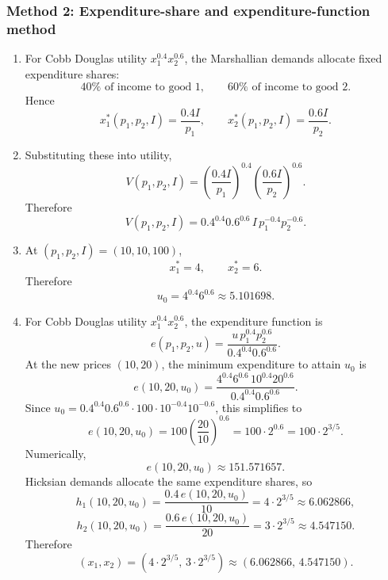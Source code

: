 \documentclass[12pt]{article}
\begin{document}
\subsubsection{Method 2: Expenditure-share and expenditure-function method}
\begin{enumerate}[label=(\alph*)]
    \item
    For Cobb Douglas utility \(x_1^{0.4}x_2^{0.6}\), the Marshallian demands allocate fixed expenditure shares:
    \[
    40\%\text{ of income to good }1,
    \qquad
    60\%\text{ of income to good }2.
    \]
    Hence
    \[
    \boxed{
    x_1^*(p_1,p_2,I)=\frac{0.4I}{p_1},
    \qquad
    x_2^*(p_1,p_2,I)=\frac{0.6I}{p_2}.
    }
    \]

    \item
    Substituting these into utility,
    \[
    V(p_1,p_2,I)
    =
    \left(\frac{0.4I}{p_1}\right)^{0.4}
    \left(\frac{0.6I}{p_2}\right)^{0.6}.
    \]
    Therefore
    \[
    \boxed{
    V(p_1,p_2,I)=0.4^{0.4}0.6^{0.6}\,I\,p_1^{-0.4}p_2^{-0.6}.
    }
    \]

    \item
    At \((p_1,p_2,I)=(10,10,100)\),
    \[
    x_1^*=4,\qquad x_2^*=6.
    \]
    Therefore
    \[
    \boxed{u_0=4^{0.4}6^{0.6}\approx 5.101698.}
    \]

    \item
    For Cobb Douglas utility \(x_1^{0.4}x_2^{0.6}\), the expenditure function is
    \[
    e(p_1,p_2,u)
    =
    \frac{u\,p_1^{0.4}p_2^{0.6}}{0.4^{0.4}0.6^{0.6}}.
    \]
    At the new prices \((10,20)\), the minimum expenditure to attain \(u_0\) is
    \[
    e(10,20,u_0)
    =
    \frac{4^{0.4}6^{0.6}\,10^{0.4}20^{0.6}}{0.4^{0.4}0.6^{0.6}}.
    \]
    Since \(u_0=0.4^{0.4}0.6^{0.6}\cdot 100\cdot 10^{-0.4}10^{-0.6}\), this simplifies to
    \[
    e(10,20,u_0)
    =
    100\left(\frac{20}{10}\right)^{0.6}
    =
    100\cdot 2^{0.6}
    =
    100\cdot 2^{3/5}.
    \]
    Numerically,
    \[
    e(10,20,u_0)\approx 151.571657.
    \]
    Hicksian demands allocate the same expenditure shares, so
    \[
    h_1(10,20,u_0)=\frac{0.4\,e(10,20,u_0)}{10}
    =4\cdot 2^{3/5}\approx 6.062866,
    \]
    \[
    h_2(10,20,u_0)=\frac{0.6\,e(10,20,u_0)}{20}
    =3\cdot 2^{3/5}\approx 4.547150.
    \]
    Therefore
    \[
    \boxed{\left(x_1,x_2\right)=\left(4\cdot 2^{3/5},\,3\cdot 2^{3/5}\right)\approx(6.062866,\,4.547150).}
    \]
\end{enumerate}

\newpage
\end{document}
